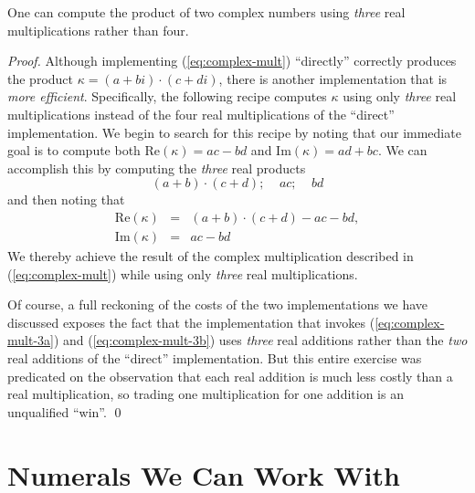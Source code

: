 
\begin{prop}
\label{thm:complex-mult-3real}
One can compute the product of two complex numbers using {\em three}
real multiplications rather than four.
\end{prop}

\begin{proof}
Although implementing (\ref{eq:complex-mult}) ``directly'' correctly
produces the product $\kappa = (a+bi) \cdot (c+di)$, there is another
implementation that is {\em more efficient}.  Specifically, the
following recipe computes $\kappa$ using only {\em three} real
multiplications instead of the four real multiplications of the
``direct'' implementation.  We begin to search for this recipe by
noting that our immediate goal is to compute both Re$(\kappa) = ac-bd$
and Im$(\kappa) = ad+bc$.  We can accomplish this by computing the
{\em three} real products
\begin{equation}
\label{eq:complex-mult-3a}
(a+b) \cdot (c+d); \ \ \ \ \
ac;  \ \ \ \ \ bd
\end{equation}
and then noting that
\begin{equation}
\label{eq:complex-mult-3b}
\begin{array}{lcl}
\mbox{Re}(\kappa) & = & (a+b) \cdot (c+d) - ac -bd, \\
\mbox{Im}(\kappa) & = & ac -bd
\end{array}
\end{equation}
We thereby achieve the result of the complex multiplication described
in (\ref{eq:complex-mult}) while using only {\em three} real
multiplications.

Of course, a full reckoning of the costs of the two implementations we
have discussed exposes the fact that the implementation that invokes
(\ref{eq:complex-mult-3a}) and (\ref{eq:complex-mult-3b}) uses {\em
  three} real additions rather than the {\em two} real additions of
the ``direct'' implementation.  But this entire exercise was
predicated on the observation that each real addition is much less
costly than a real multiplication, so trading one multiplication for
one addition is an unqualified ``win''.  \qed
\end{proof}



\section{Numerals We Can Work With}
\label{sec:Numerals}

